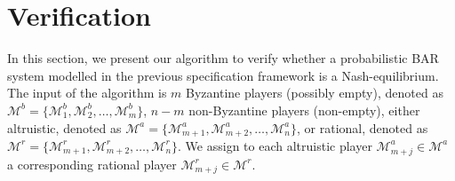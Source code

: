 \section{Verification}\label{sec:verification}

In this section, we present our algorithm to verify whether a probabilistic BAR system modelled in the previous specification framework is a Nash-equilibrium. The input of the algorithm is
$m$ Byzantine players (possibly empty), denoted as $\mathcal{M}^b=\{\mathcal{M}^b_1, \mathcal{M}^b_2, \dots, \mathcal{M}^b_m\}$, 
$n-m$ non-Byzantine players (non-empty), either altruistic, denoted as $\mathcal{M}^a=\{\mathcal{M}^a_{m+1}, \mathcal{M}^a_{m+2}, \dots, \mathcal{M}^a_n\}$, or rational, denoted as $\mathcal{M}^r=\{\mathcal{M}^r_{m+1}, \mathcal{M}^r_{m+2}, \dots, \mathcal{M}^r_n\}$. We assign to each altruistic player  $\mathcal{M}^a_{m+j}\in \mathcal{M}^a$ a corresponding rational player $\mathcal{M}^r_{m+j}\in \mathcal{M}^r$. 



